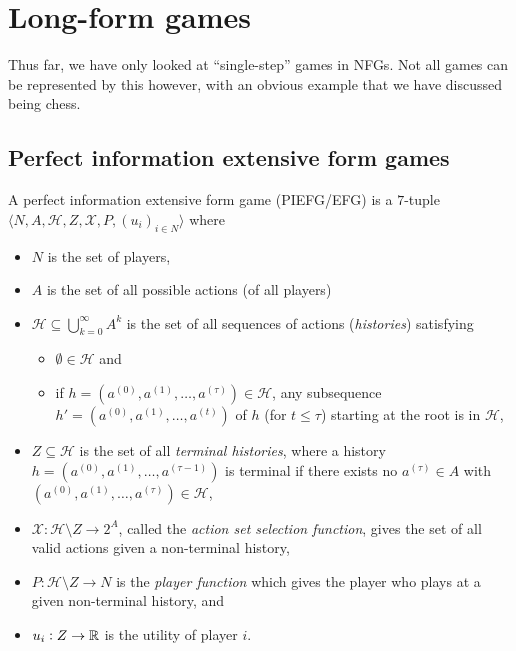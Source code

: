 \section{Long-form games}

Thus far, we have only looked at ``single-step'' games in NFGs. Not all games can be represented by this however, with an obvious example that we have discussed being chess.

\subsection{Perfect information extensive form games}

	\begin{fdef}
		A perfect information extensive form game (PIEFG/EFG) is a $7$-tuple $\langle N,A,\mathcal{H},Z,\mathcal{X},P,(u_i)_{i\in N}\rangle$ where
		\begin{itemize}
			\item $N$ is the set of players,
			\item $A$ is the set of all possible actions (of all players)
			\item $\mathcal{H} \subseteq \bigcup_{k=0}^{\infty} A^k$ is the set of all sequences of actions (\emph{histories}) satisfying
			\begin{itemize}
				\item $\emptyset \in \mathcal{H}$ and
				\item if $h = (a^{(0)},a^{(1)},\ldots,a^{(\tau)}) \in \mathcal{H}$, any subsequence $h' = (a^{(0)},a^{(1)},\ldots,a^{(t)})$ of $h$ (for $t \le \tau$) starting at the root is in $\mathcal{H}$,
			\end{itemize}
			\item $Z \subseteq \mathcal{H}$ is the set of all \emph{terminal histories}, where a history $h = (a^{(0)},a^{(1)},\ldots,a^{(\tau-1)})$ is terminal if there exists no $a^{(\tau)} \in A$ with $(a^{(0)},a^{(1)},\ldots,a^{(\tau)}) \in \mathcal{H}$,
			\item $\mathcal{X} : \mathcal{H} \setminus Z \to 2^A$, called the \emph{action set selection function}, gives the set of all valid actions given a non-terminal history,
			\item $P : \mathcal{H}\setminus Z \to N$ is the \emph{player function} which gives the player who plays at a given non-terminal history, and
			\item $u_i : Z \to \mathbb{R}$ is the utility of player $i$.
		\end{itemize}
	\end{fdef}

